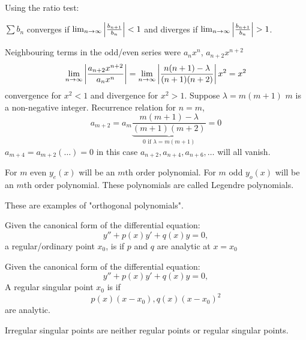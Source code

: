\documentclass[10pt, a4paper]{article}
\begin{document}
\begin{example}
\begin{solution}
        Using the ratio test:

        $\sum b_n$ converges if $\lim_{n \rightarrow \infty}\left|\frac{b_{n + 1}}{b_n}\right| < 1$ and diverges if $\lim_{n \rightarrow \infty}\left|\frac{b_{n + 1}}{b_n}\right| > 1$.

        Neighbouring terms in the odd/even series were $a_nx ^ n$,
        $a_{n + 2}x ^ {n + 2}$
        \[
        \lim_{n \rightarrow \infty}\left|\frac{a_{n + 2}x ^ {n + 2}}{a_nx ^ n}\right| = \lim_{n \rightarrow \infty}\left|\frac{n(n + 1) - \lambda}{(n + 1)(n + 2)}\right|x ^ 2 = x ^ 2
        \]
        convergence for $x ^ 2 < 1$ and divergence for $x ^ 2 > 1$.
        Suppose $\lambda = m(m + 1)$ $m$ is a non-negative integer.
        Recurrence relation for $n = m$,
        \[
        a_{m + 2} = a_m\underbrace{\frac{m(m + 1) - \lambda}{(m + 1)(m + 2)}}_{0\text{ if } \lambda = m(m + 1)} = 0
        \]
        $a_{m + 4} = a_{m + 2}(\dotsc) = 0$ in this case $a_{n + 2}, a_{n + 4}, a_{n + 6}, \dotsc$ will all vanish.

        For $m$ even $y_e(x)$ will be an $m$th order polynomial.
        For $m$ odd $y_o(x)$ will be an $m$th order polynomial.
        These polynomials are called Legendre polynomials.

        These are examples of "orthogonal polynomials".
    \end{solution}
\end{example}

\begin{definition}
    Given the canonical form of the differential equation:
    \[
    y'' + p(x)y' + q(x)y = 0,
    \]
    a regular/ordinary point $x_0$,
    is if $p$ and $q$ are analytic at $x = x_0$
\end{definition}

\begin{definition}
    Given the canonical form of the differential equation:
    \[
    y'' + p(x)y' + q(x)y = 0,
    \]
    A regular singular point $x_0$ is if
    \[
    p(x)(x - x_0), q(x)(x - x_0) ^ 2
    \]
    are analytic.
\end{definition}

\begin{definition}
    Irregular singular points are neither regular points or regular singular points.
\end{definition}
\end{document}
